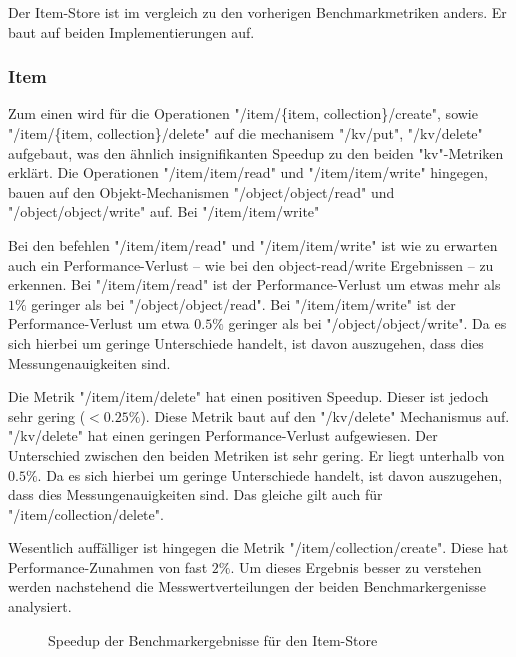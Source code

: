\FloatBarrier

Der Item-Store ist im vergleich zu den vorherigen Benchmarkmetriken anders. Er baut auf beiden Implementierungen auf.

\subsubsection{Item}

Zum einen wird für die Operationen "/item/\{item, collection\}/create", sowie "/item/\{item, collection\}/delete" auf die mechanisem "/kv/put", "/kv/delete" aufgebaut, was den ähnlich insignifikanten Speedup zu den beiden "kv"-Metriken erklärt. 
Die Operationen "/item/item/read" und "/item/item/write" hingegen, bauen auf den Objekt-Mechanismen "/object/object/read" und "/object/object/write" auf. Bei "/item/item/write"

Bei den befehlen "/item/item/read" und "/item/item/write" ist wie zu erwarten auch ein Performance-Verlust – wie bei den object-read/write Ergebnissen – zu erkennen. Bei "/item/item/read" ist der Performance-Verlust um etwas mehr als $1\%$ geringer als bei "/object/object/read". Bei "/item/item/write" ist der Performance-Verlust um etwa $0.5\%$ geringer als bei "/object/object/write". Da es sich hierbei um geringe Unterschiede handelt, ist davon auszugehen, dass dies Messungenauigkeiten sind. 

Die Metrik "/item/item/delete" hat einen positiven Speedup. Dieser ist jedoch sehr gering ($<0.25\%$). Diese Metrik baut auf den "/kv/delete" Mechanismus auf. "/kv/delete" hat einen geringen Performance-Verlust aufgewiesen. Der Unterschied zwischen den beiden Metriken ist sehr gering. Er liegt unterhalb von $0.5\%$. Da es sich hierbei um geringe Unterschiede handelt, ist davon auszugehen, dass dies Messungenauigkeiten sind. Das gleiche gilt auch für "/item/collection/delete".

Wesentlich auffälliger ist hingegen die Metrik "/item/collection/create". Diese hat Performance-Zunahmen von fast $2\%$. Um dieses Ergebnis besser zu verstehen werden nachstehend die Messwertverteilungen der beiden Benchmarkergenisse analysiert. 

\begin{figure}
    \centering
    
    \caption{Speedup der Benchmarkergebnisse für den Item-Store}
    \label{fig:speedup_item}
\end{figure}

